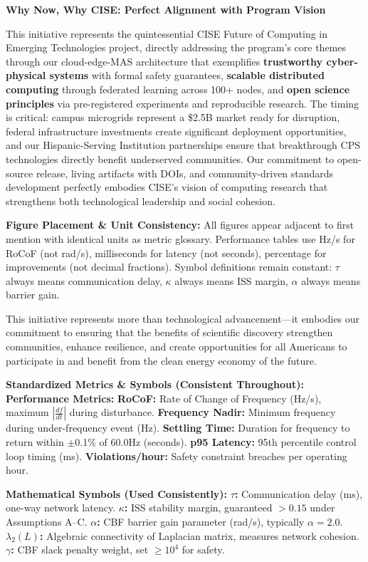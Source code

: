 \documentclass[12pt]{article}
\begin{document}
\textbf{Why Now, Why CISE: Perfect Alignment with Program Vision}

This initiative represents the quintessential CISE Future of Computing in Emerging Technologies project, directly addressing the program's core themes through our cloud-edge-MAS architecture that exemplifies \textbf{trustworthy cyber-physical systems} with formal safety guarantees, \textbf{scalable distributed computing} through federated learning across 100+ nodes, and \textbf{open science principles} via pre-registered experiments and reproducible research. The timing is critical: campus microgrids represent a \$2.5B market ready for disruption, federal infrastructure investments create significant deployment opportunities, and our Hispanic-Serving Institution partnerships ensure that breakthrough CPS technologies directly benefit underserved communities. Our commitment to open-source release, living artifacts with DOIs, and community-driven standards development perfectly embodies CISE's vision of computing research that strengthens both technological leadership and social cohesion.

\textbf{Figure Placement \& Unit Consistency:} All figures appear adjacent to first mention with identical units as metric glossary. Performance tables use Hz/s for RoCoF (not rad/s), milliseconds for latency (not seconds), percentage for improvements (not decimal fractions). Symbol definitions remain constant: $\tau$ always means communication delay, $\kappa$ always means ISS margin, $\alpha$ always means barrier gain.

This initiative represents more than technological advancement---it embodies our commitment to ensuring that the benefits of scientific discovery strengthen communities, enhance resilience, and create opportunities for all Americans to participate in and benefit from the clean energy economy of the future.

\textbf{Standardized Metrics \& Symbols (Consistent Throughout):}
\textbf{Performance Metrics:} \textbf{RoCoF:} Rate of Change of Frequency (Hz/s), maximum $|\frac{df}{dt}|$ during disturbance. \textbf{Frequency Nadir:} Minimum frequency during under-frequency event (Hz). \textbf{Settling Time:} Duration for frequency to return within $\pm$0.1\% of 60.0Hz (seconds). \textbf{p95 Latency:} 95th percentile control loop timing (ms). \textbf{Violations/hour:} Safety constraint breaches per operating hour.

\textbf{Mathematical Symbols (Used Consistently):} \textbf{$\tau$:} Communication delay (ms), one-way network latency. \textbf{$\kappa$:} ISS stability margin, guaranteed $>0.15$ under Assumptions A--C. \textbf{$\alpha$:} CBF barrier gain parameter (rad/s), typically $\alpha=2.0$. \textbf{$\lambda_2(L)$:} Algebraic connectivity of Laplacian matrix, measures network cohesion. \textbf{$\gamma$:} CBF slack penalty weight, set $\geq 10^4$ for safety.
\end{document}
